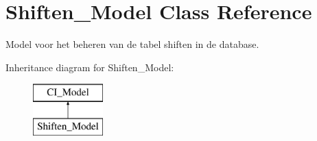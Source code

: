 \hypertarget{class_shiften___model}{}\section{Shiften\+\_\+\+Model Class Reference}
\label{class_shiften___model}


Model voor het beheren van de tabel shiften in de database.  


Inheritance diagram for Shiften\+\_\+\+Model\+:\begin{figure}[H]
\begin{center}
\leavevmode
\includegraphics[height=2.000000cm]{class_shiften___model}
\end{center}
\end{figure}
